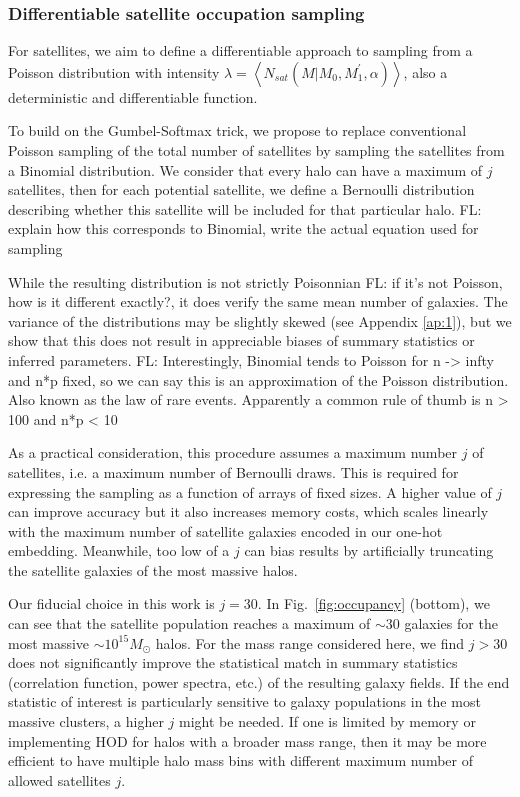 \documentclass[a4paper,usenatbib]{mnras}
\newcommand{\FL}[1]{{\color{magenta}FL: #1}}
\begin{document}
\subsubsection{Differentiable satellite occupation sampling}

For satellites, we aim to define a differentiable approach to sampling from a Poisson distribution with intensity $\lambda=\left\langle N_{sat}(M | M_0, M_1^\prime, \alpha)\right\rangle$, also a deterministic and differentiable function.

To build on the Gumbel-Softmax trick, we propose to replace conventional Poisson sampling of the total number of satellites by sampling the satellites from a Binomial distribution. We consider that every halo can have a maximum of $j$ satellites, then for each potential satellite, we define a Bernoulli distribution describing whether this satellite will be included for that particular halo. \FL{explain how this corresponds to Binomial, write the actual equation used for sampling}

While the resulting distribution is not strictly Poisonnian \FL{if it's not Poisson, how is it different exactly?}, it does verify the same mean number of galaxies. The variance of the distributions may be slightly skewed (see Appendix \ref{ap:1}), but we show that this does not result in appreciable biases of summary statistics or inferred parameters. \FL{Interestingly, Binomial tends to Poisson for n -> infty and n*p fixed, so we can say this is an approximation of the Poisson distribution. Also known as the law of rare events. Apparently a common rule of thumb is n > 100 and n*p < 10}

As a practical consideration, this procedure assumes a maximum number $j$ of satellites, i.e. a maximum number of Bernoulli draws. This is required for expressing the sampling as a function of arrays of fixed sizes. A higher value of $j$ can improve accuracy but it also increases memory costs, which scales linearly with the maximum number of satellite galaxies 
encoded in our one-hot embedding.
Meanwhile, too low of a $j$ can bias results by artificially truncating 
the satellite galaxies of the most massive halos. 

Our fiducial choice in this work is $j = 30$. In Fig.~\ref{fig:occupancy} (bottom), we can see that the satellite population reaches a maximum of $\sim 30$ galaxies for the most massive $\sim 10^{15} M_\odot$ halos. For the mass range considered here, we find $j > 30$ does not significantly improve the statistical match in summary statistics (correlation function, power spectra, etc.) of the resulting galaxy fields.
If the end statistic of interest is particularly sensitive to galaxy populations in the most massive clusters, a higher $j$ might be needed. If one is limited by memory or implementing HOD for halos with a broader mass range, then it may be more efficient to have multiple
halo mass bins with different maximum number of allowed satellites $j$.
\end{document}
